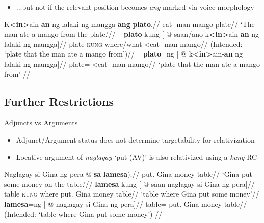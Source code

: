 \documentclass[pdf]{beamer}
\newcommand{\ix}[1]{{\footnotesize<}#1{\footnotesize>}}
\newcommand{\g}[1]{\textsc{#1}}
\newcommand{\glp}[3][ ]{\textit{#2}#1`#3'}
\newcommand{\texthl}[1]{\textcolor{cyan!75!blue}{\textbf{#1}}}
\begin{document}
\begin{frame}%
  \begin{itemize}
    \item ...but not if the relevant position becomes \textit{ang}-marked via voice morphology
  \end{itemize}
  \ex\begingl
    \gla  K\texthl{\ix{in}}ain-\texthl{an} ng lalaki ng mangga \texthl{ang} \texthl{plato}.//
    \glb  \ix{\Pfv}eat-\Lv{} \Gen{} man \Gen{} mango \Nom{} plate//
    \glft `The man ate a mango from the plate.'//
    \endgl
  \xe
  \ex~\ljudge{*}\begingl
    \gla  \texthl{plato} kung [ @ saan/ano k\texthl{\ix{in}}ain-\texthl{an} ng lalaki ng mangga]//
    \glb  plate \g{kung} where/what \ix{\Pfv}eat-\Lv{} \Gen{} man \Gen{} mango//
    \glft (Intended: `plate that the man ate a mango from')//
    \endgl
  \xe\vspace{-1em}\pause
  \ex~\begingl
    \gla  \texthl{plato}=ng [ @ k\texthl{\ix{in}}ain-\texthl{an} ng lalaki ng mangga]//
    \glb  plate=\Lk{} \ix{\Pfv}eat-\Lv{} \Gen{} man \Gen{} mango//
    \glft `plate that the man ate a mango from'
          //
  \endgl
  \xe
\end{frame}

\subsection{Further Restrictions}

\begin{frame}{Adjuncts vs Arguments}
  \begin{itemize}
    \item Adjunct/Argument status does not determine targetability for relativization
    \item Locative argument of \glp{naglagay}{put (AV)} is also relativized using a \textit{kung} RC
  \end{itemize}
  \ex\begingl
    \gla  Naglagay si Gina ng pera \nogloss{*(} @ \texthl{sa} \texthl{lamesa}).//
    \glb  put.\Av{} \Nom{} Gina \Gen{} money \Obl{} table//
    \glft `Gina put some money on the table.'//
  \endgl
  \xe
  \ex\begingl
    \gla  \texthl{lamesa} kung [ @ saan naglagay si Gina ng pera]//
    \glb  table \g{kung} where put.\Av{} \Nom{} Gina \Gen{} money \Obl{} table//
    \glft `table where Gina put some money'//
  \endgl
  \xe\vspace{-1em}\pause
  \ex\ljudge{*}\begingl
    \gla  \texthl{lamesa}=ng [ @ naglagay si Gina ng pera]//
    \glb  table=\Lk{} put.\Av{} \Nom{} Gina \Gen{} money \Obl{} table//
    \glft (Intended: `table where Gina put some money')
          //
  \endgl
  \xe
\end{frame}
\end{document}
